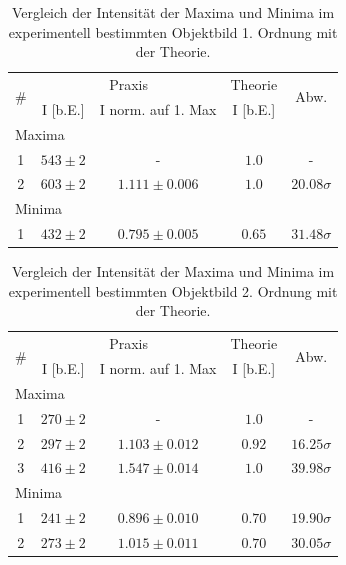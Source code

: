 \begin{table}[H]
  \centering
  \caption{Vergleich der Intensität der Maxima und Minima im experimentell bestimmten Objektbild 1. Ordnung mit der Theorie.}
  \vspace*{0.5em}
  \begin{tabular}{|c|c|c|c|c|}\hline
    \multirow{2}{*}{\#} & \multicolumn{2}{c|}{Praxis} & \multicolumn{1}{c|}{Theorie} & \multirow{2}{*}{Abw.}\\\cline{2-4}
        & I [b.E.] & I norm. auf 1. Max & I [b.E.] & \\\hline
    \multicolumn{5}{|l|}{Maxima}\\\hline
    1   & $543 \pm 2$ & -                             & $1.0$& - \\
    2   & $603 \pm 2$ & $1.111 \pm 0.006$ & $1.0$  & $20.08\sigma$\\\hline
    \multicolumn{5}{|l|}{Minima}\\\hline
    1   & $432 \pm 2$ & $0.795 \pm 0.005$ & $0.65$ & $31.48\sigma$\\\hline
  \end{tabular}
  \label{tab:vergl_objbild_ma_mi_i_ord1}
\end{table}

\begin{table}[H]
  \centering
  \caption{Vergleich der Intensität der Maxima und Minima im experimentell bestimmten Objektbild 2. Ordnung mit der Theorie.}
  \vspace*{0.5em}
  \begin{tabular}{|c|c|c|c|c|}\hline
    \multirow{2}{*}{\#} & \multicolumn{2}{c|}{Praxis} & \multicolumn{1}{c|}{Theorie} & \multirow{2}{*}{Abw.}\\\cline{2-4}
        & I [b.E.] & I norm. auf 1. Max & I [b.E.] & \\\hline
    \multicolumn{5}{|l|}{Maxima}\\\hline
    1   & $270 \pm 2$ & -                             & $1.0$               & - \\
    2   & $297 \pm 2$ & $1.103 \pm 0.012$ & $0.92$ &  $16.25\sigma$\\
    3   & $416 \pm 2$ & $1.547 \pm 0.014$ & $1.0$ & $39.98\sigma$\\\hline
    \multicolumn{5}{|l|}{Minima}\\\hline
    1   & $241 \pm 2$ & $0.896 \pm 0.010$ & $0.70$ & $19.90\sigma$\\
    2   & $273 \pm 2$ & $1.015 \pm 0.011$ & $0.70$ & $30.05\sigma$\\\hline
  \end{tabular}
  \label{tab:vergl_objbild_ma_mi_i_ord2}
\end{table}

